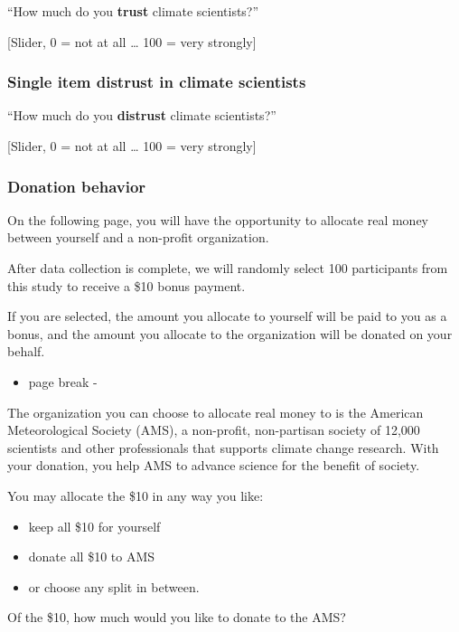\documentclass[
  letterpaper,
  DIV=11,
  numbers=noendperiod]{scrartcl}
\providecommand{\tightlist}{%
  \setlength{\itemsep}{0pt}\setlength{\parskip}{0pt}}
\begin{document}
``How much do you \textbf{trust} climate scientists?''

{[}Slider, 0 = not at all \ldots{} 100 = very strongly{]}

\subsubsection{Single item distrust in climate
scientists}\label{single-item-distrust-in-climate-scientists}

``How much do you \textbf{distrust} climate scientists?''

{[}Slider, 0 = not at all \ldots{} 100 = very strongly{]}

\subsubsection{Donation behavior}\label{donation-behavior}

On the following page, you will have the opportunity to allocate real
money between yourself and a non-profit organization.

After data collection is complete, we will randomly select 100
participants from this study to receive a \$10 bonus payment.

If you are selected, the amount you allocate to yourself will be paid to
you as a bonus, and the amount you allocate to the organization will be
donated on your behalf.

\begin{itemize}
\tightlist
\item
  page break -
\end{itemize}

The organization you can choose to allocate real money to is the
American Meteorological Society (AMS), a non-profit, non-partisan
society of 12,000 scientists and other professionals that supports
climate change research. With your donation, you help AMS to advance
science for the benefit of society.

You may allocate the \$10 in any way you like:

\begin{itemize}
\tightlist
\item
  keep all \$10 for yourself
\item
  donate all \$10 to AMS
\item
  or choose any split in between.
\end{itemize}

Of the \$10, how much would you like to donate to the AMS?
\end{document}
